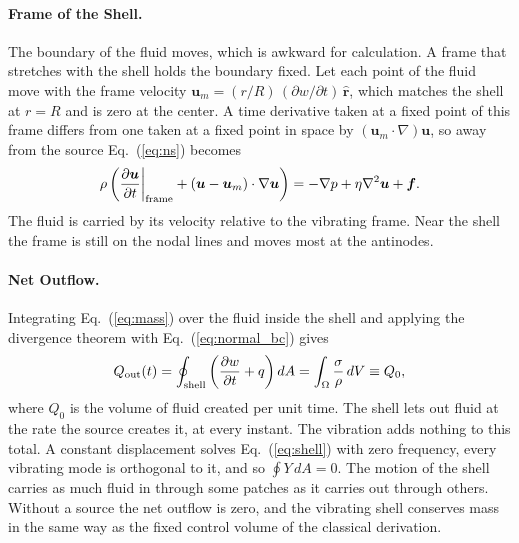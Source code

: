 \documentclass[12pt]{article}
\begin{document}
\paragraph{Frame of the Shell.} The boundary of the fluid moves, which is awkward for calculation. A frame that stretches with the shell holds the boundary fixed. Let each point of the fluid move with the frame velocity $\bm{u}_m = (r/R)\,(\partial w/\partial t)\,\hat{\bm r}$, which matches the shell at $r = R$ and is zero at the center. A time derivative taken at a fixed point of this frame differs from one taken at a fixed point in space by $(\bm{u}_m\cdot\nabla)\bm{u}$, so away from the source Eq.~(\ref{eq:ns}) becomes
%
\begin{equation}
\rho\left(\frac{\partial \bm{u}}{\partial t}\bigg|_{\rm frame} + (\bm{u} - \bm{u}_m)\cdot\nabla\bm{u}\right) = -\nabla p + \eta\nabla^2\bm{u} + \bm{f}.
\end{equation}
%
The fluid is carried by its velocity relative to the vibrating frame. Near the shell the frame is still on the nodal lines and moves most at the antinodes.

\paragraph{Net Outflow.} Integrating Eq.~(\ref{eq:mass}) over the fluid inside the shell and applying the divergence theorem with Eq.~(\ref{eq:normal_bc}) gives
%
\begin{equation}
Q_{\rm out}(t) = \oint_{\rm shell}\left(\frac{\partial w}{\partial t} + q\right) dA = \int_{\Omega} \frac{\sigma}{\rho}\, dV \equiv Q_0,
\label{eq:outflow}
\end{equation}
%
where $Q_0$ is the volume of fluid created per unit time. The shell lets out fluid at the rate the source creates it, at every instant. The vibration adds nothing to this total. A constant displacement solves Eq.~(\ref{eq:shell}) with zero frequency, every vibrating mode is orthogonal to it, and so $\oint Y\, dA = 0$. The motion of the shell carries as much fluid in through some patches as it carries out through others. Without a source the net outflow is zero, and the vibrating shell conserves mass in the same way as the fixed control volume of the classical derivation.
\end{document}
